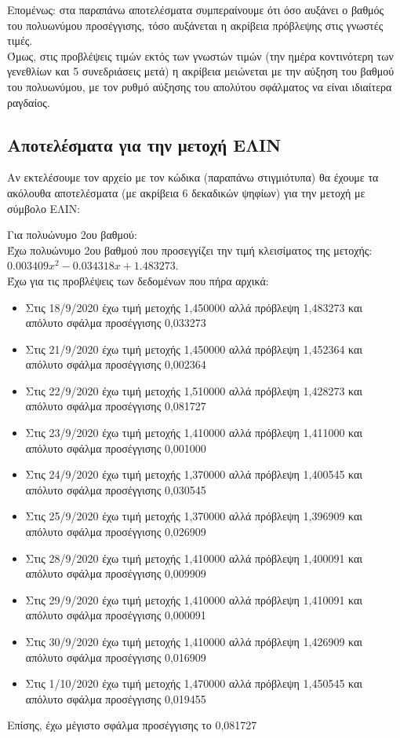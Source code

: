 \documentclass[a4paper,11pt]{article}
\newcommand{\lt}{\latintext}
\begin{document}
\par
Επομένως: στα παραπάνω αποτελέσματα συμπεραίνουμε ότι όσο αυξάνει ο βαθμός του πολυωνύμου προσέγγισης, τόσο αυξάνεται η ακρίβεια πρόβλεψης στις γνωστές τιμές.\\
Όμως, στις προβλέψεις τιμών εκτός των γνωστών τιμών (την ημέρα κοντινότερη των γενεθλίων και 5 συνεδριάσεις μετά) η ακρίβεια μειώνεται με την αύξηση του βαθμού του πολυωνύμου, με τον ρυθμό αύξησης του απολύτου σφάλματος να είναι ιδιαίτερα ραγδαίος.

\subsection{Αποτελέσματα για την μετοχή ΕΛΙΝ}
Αν εκτελέσουμε τον αρχείο με τον κώδικα (παραπάνω στιγμιότυπα) θα έχουμε τα ακόλουθα αποτελέσματα (με ακρίβεια 6 δεκαδικών ψηφίων) για την μετοχή με σύμβολο ΕΛΙΝ:\\

\par 
Για πολυώνυμο 2ου βαθμού:\\

Έχω πολυώνυμο 2ου βαθμού που προσεγγίζει την τιμή κλεισίματος της μετοχής: {\lt $0.003409x^2 -0.034318x + 1.483273$}.\\


Έχω για τις προβλέψεις των δεδομένων που πήρα αρχικά:
\begin{itemize}
	\item Στις 18/9/2020 έχω τιμή μετοχής 1,450000 αλλά πρόβλεψη 1,483273 και απόλυτο σφάλμα προσέγγισης 0,033273
	\item Στις 21/9/2020 έχω τιμή μετοχής 1,450000 αλλά πρόβλεψη 1,452364 και απόλυτο σφάλμα προσέγγισης 0,002364
	\item Στις 22/9/2020 έχω τιμή μετοχής 1,510000 αλλά πρόβλεψη 1,428273 και απόλυτο σφάλμα προσέγγισης 0,081727
	\item Στις 23/9/2020 έχω τιμή μετοχής 1,410000 αλλά πρόβλεψη 1,411000 και απόλυτο σφάλμα προσέγγισης 0,001000
	\item Στις 24/9/2020 έχω τιμή μετοχής 1,370000 αλλά πρόβλεψη 1,400545 και απόλυτο σφάλμα προσέγγισης 0,030545
	\item Στις 25/9/2020 έχω τιμή μετοχής 1,370000 αλλά πρόβλεψη 1,396909 και απόλυτο σφάλμα προσέγγισης 0,026909
	\item Στις 28/9/2020 έχω τιμή μετοχής 1,410000 αλλά πρόβλεψη 1,400091 και απόλυτο σφάλμα προσέγγισης 0,009909
	\item Στις 29/9/2020 έχω τιμή μετοχής 1,410000 αλλά πρόβλεψη 1,410091 και απόλυτο σφάλμα προσέγγισης 0,000091
	\item Στις 30/9/2020 έχω τιμή μετοχής 1,410000 αλλά πρόβλεψη 1,426909 και απόλυτο σφάλμα προσέγγισης 0,016909
	\item Στις 1/10/2020 έχω τιμή μετοχής 1,470000 αλλά πρόβλεψη 1,450545 και απόλυτο σφάλμα προσέγγισης 0,019455
\end{itemize}
Επίσης, έχω μέγιστο σφάλμα προσέγγισης το 0,081727\\
\end{document}
